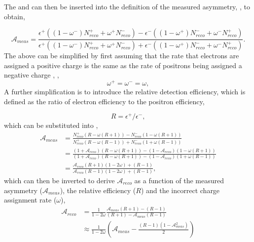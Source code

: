 The  and  can then be inserted
into the definition of the measured asymmetry, , to obtain,

\begin{equation}
\label{eq:meas1}
\mathcal{A}_{meas} = \frac{
  \epsilon^+ ( ( 1 - \omega^- ) N_{reco}^{+} + \omega^+ N_{reco}^{-} ) -
  \epsilon^- ( ( 1 - \omega^+ ) N_{reco}^{-} + \omega^- N_{reco}^{+} )
}
{
  \epsilon^+ ( ( 1 - \omega^- ) N_{reco}^{+} + \omega^+ N_{reco}^{-} ) +
  \epsilon^- ( ( 1 - \omega^+ ) N_{reco}^{-} + \omega^- N_{reco}^{+} )
} .
\end{equation}
The above can be simplified by first assuming that the rate that
electrons are assigned a positive charge is the same as the rate of positrons
being assigned a negative charge\cite{baisini2010electron} , \ie,
\begin{equation}
  \omega^{+} = \omega^{-} = \omega ,
\end{equation}
A further simplification is to introduce the relative detection efficiency,
which is defined as the ratio of electron efficiency to the positron efficiency,

\begin{equation}
 R = \epsilon^+/\epsilon^- ,
\end{equation}
which can be substituted into ,
\begin{align}
\mathcal{A}_{meas} 
&= \frac{
  N_{reco}^{+} (R - \omega(R+1)) -
  N_{reco}^{-} (1 - \omega(R+1))
}
{
  N_{reco}^{+} (R - \omega(R-1)) +
  N_{reco}^{-} (1 + \omega(R-1))
}\\
&= \frac{
  (1+\mathcal{A}_{reco}) (R - \omega(R+1)) -
  (1-\mathcal{A}_{reco}) (1 - \omega(R+1))
}
{
  (1+\mathcal{A}_{reco}) (R - \omega(R+1)) -
  (1-\mathcal{A}_{reco}) (1 + \omega(R-1))
}\\
&= \frac{
  \mathcal{A}_{reco} (R + 1)(1 - 2 \omega) + (R - 1)
}
{
  \mathcal{A}_{reco} (R - 1)(1 - 2 \omega) + (R - 1)
},
\end{align}
which can then be inverted to derive $\mathcal{A}_{reco}$ as a function of the
measured asymmetry ($\mathcal{A}_{meas}$), the relative efficiency ($R$) and the
incorrect charge assignment rate ($\omega$),
\begin{align}
\mathcal{A}_{reco}
&=\frac{1}{1-2\omega}
  \frac{
    \mathcal{A}_{meas} (R + 1) - (R-1)
  }
  {
    (R + 1) - \mathcal{A}_{meas} (R-1)
  }\\
&\approx \frac{1}{1-2\omega}
\left(
  \mathcal{A}_{meas} -
\frac{ (R - 1)(1 - \mathcal{A}_{meas}^{2}) } { 2 }
\right)
\end{align}

